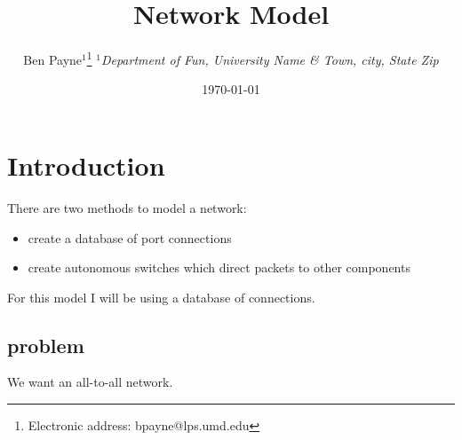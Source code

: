 \documentclass[pdftex]{article}
\begin{document}
\title{Network Model}

\author{Ben Payne$^{1}$\footnote{Electronic address: bpayne@lps.umd.edu}
{\it $^{1}$Department of Fun, University Name \& Town, city, State Zip}}

\date{\today}



\tableofcontents


\section{Introduction}

There are two methods to model a network:
\begin{itemize}
 \item create a database of port connections
 \item create autonomous switches which direct packets to other components
\end{itemize}
For this model I will be using a database of connections.

\subsection{problem}

We want an all-to-all network. 
\end{document}
